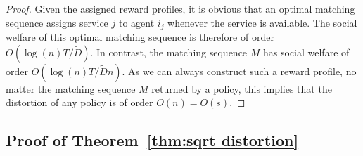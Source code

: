 \documentclass[letterpaper,11pt]{article}
\newcommand{\kibitz}[2]{\ifnum\Comments=1{\color{#1}{#2}}\fi}
\newcommand{\dm}[1]{\kibitz{ForestGreen}{[Deb: #1]}}
\newcommand{\todo}[1]{\kibitz{red}{[Nick: #1]}}
\begin{document}
\begin{proof}
    Given the assigned reward profiles, it is obvious that an optimal matching sequence assigns service $j$ to agent $i_{j}$ whenever the service is available. The social welfare of this optimal matching sequence is therefore of order $O(\log{(n)}T/\tilde{D})$. In contrast, the matching sequence $M$ has social welfare of order $O(\log{(n)}T/\tilde{D}n)$. As we can always construct such a reward profile, no matter the matching sequence $M$ returned by a policy, this implies that the distortion of any policy is of order $O(n) = O(s)$.
    
    
\end{proof}

\subsection{Proof of Theorem~\ref{thm:sqrt distortion}}
\end{document}
